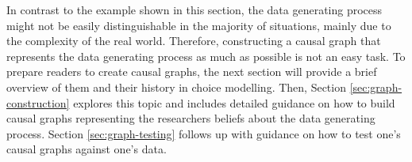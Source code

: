 In contrast to the example shown in this section, the data generating process might not be easily distinguishable in the majority of situations, mainly due to the complexity of the real world.
Therefore, constructing a causal graph that represents the data generating process as much as possible is not an easy task.
To prepare readers to create causal graphs, the next section will provide a brief overview of them and their history in choice modelling.
Then, Section \ref{sec:graph-construction} explores this topic and includes detailed guidance on how to build causal graphs representing the researchers beliefs about the data generating process.
Section \ref{sec:graph-testing} follows up with guidance on how to test one's causal graphs against one's data.
